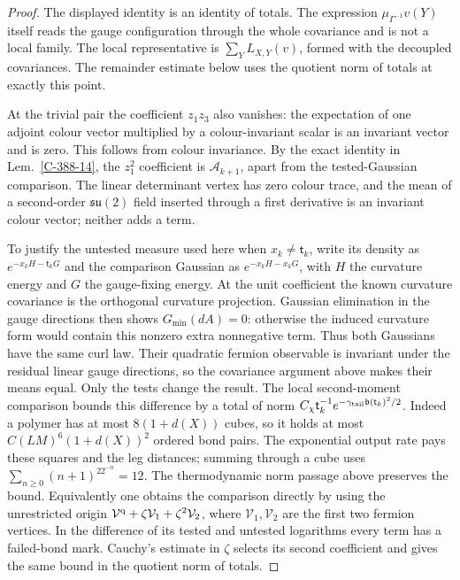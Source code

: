 \documentclass[11pt,letterpaper,reqno]{amsart}
\theoremstyle{definition}
\theoremstyle{remark}
\begin{document}
\begin{proof}
The displayed identity is an identity of totals.
The expression $\mu_{\Gamma^{-1}}v(Y)$ itself reads
the gauge configuration through the whole covariance
and is not a local family.  The local representative
is $\sum_YL_{X,Y}(v)$, formed with the decoupled
covariances.  The remainder estimate below uses the
quotient norm of totals at exactly this point.

At the trivial pair the coefficient $z_1z_3$ also vanishes:
the expectation of one adjoint colour vector multiplied
by a colour-invariant scalar is an invariant vector and
is zero.  This follows from colour invariance.  By the exact identity in
Lem.~\ref{C-388-14}, the $z_1^2$ coefficient is
$\mathscr A_{k+1}$, apart from the tested-Gaussian
comparison.  The linear determinant vertex has zero
colour trace, and the mean of a second-order
$\mathfrak{su}(2)$ field inserted through a first
derivative is an invariant colour vector; neither adds
a term.

To justify the untested measure used here when $x_k\ne \mathsf t_k$,
write its density as $e^{-x_kH-\mathsf t_kG}$ and the comparison
Gaussian as $e^{-x_kH-x_kG}$, with $H$ the curvature
energy and $G$ the gauge-fixing energy.  At the unit
coefficient the known curvature covariance is the
orthogonal curvature projection.  Gaussian elimination
in the gauge directions then shows $G_{\min}(dA)=0$:
otherwise the induced curvature form would contain this
nonzero extra nonnegative term.  Thus both Gaussians
have the same curl law.  Their quadratic fermion
observable is invariant under the residual linear gauge
directions, so the covariance argument above makes
their means equal.  Only the tests change the result.
The local second-moment comparison bounds this
difference by a total of norm
$C_\chi \mathsf t_k^{-1}e^{-\gamma_{\rm tail}\mathfrak b(\mathsf t_k)^2/2}$.
Indeed a polymer has at most $8(1+d(X))$ cubes, so it
holds at most $C(LM)^6(1+d(X))^2$ ordered bond pairs.
The exponential output rate pays these squares and
the leg distances; summing through a cube uses
$\sum_{n\ge0}(n+1)^22^{-n}=12$.
The thermodynamic norm passage above preserves the bound.
Equivalently one obtains the comparison directly by
using the unrestricted origin
$\mathcal V^{\rm q}+\zeta\mathcal V_1+
\zeta^2\mathcal V_2$, where $\mathcal V_1,\mathcal V_2$
are the first two fermion vertices.  In the difference
of its tested and untested logarithms every term has
a failed-bond mark.  Cauchy's estimate in $\zeta$
selects its second coefficient and gives the same
bound in the quotient norm of totals.


\end{proof}
\end{document}
